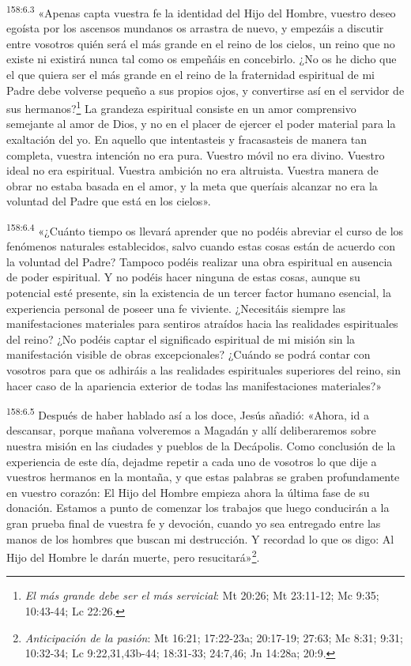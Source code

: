 \par
\textsuperscript{158:6.3} «Apenas capta vuestra fe la identidad del Hijo del Hombre, vuestro deseo egoísta por los ascensos mundanos os arrastra de nuevo, y empezáis a discutir entre vosotros quién será el más grande en el reino de los cielos, un reino que no existe ni existirá nunca tal como os empeñáis en concebirlo. ¿No os he dicho que el que quiera ser el más grande en el reino de la fraternidad espiritual de mi Padre debe volverse pequeño a sus propios ojos, y convertirse así en el servidor de sus hermanos?\footnote{\textit{El más grande debe ser el más servicial}: Mt 20:26; Mt 23:11-12; Mc 9:35; 10:43-44; Lc 22:26.} La grandeza espiritual consiste en un amor comprensivo semejante al amor de Dios, y no en el placer de ejercer el poder material para la exaltación del yo. En aquello que intentasteis y fracasasteis de manera tan completa, vuestra intención no era pura. Vuestro móvil no era divino. Vuestro ideal no era espiritual. Vuestra ambición no era altruista. Vuestra manera de obrar no estaba basada en el amor, y la meta que queríais alcanzar no era la voluntad del Padre que está en los cielos».

\par
\textsuperscript{158:6.4} «¿Cuánto tiempo os llevará aprender que no podéis abreviar el curso de los fenómenos naturales establecidos, salvo cuando estas cosas están de acuerdo con la voluntad del Padre? Tampoco podéis realizar una obra espiritual en ausencia de poder espiritual. Y no podéis hacer ninguna de estas cosas, aunque su potencial esté presente, sin la existencia de un tercer factor humano esencial, la experiencia personal de poseer una fe viviente. ¿Necesitáis siempre las manifestaciones materiales para sentiros atraídos hacia las realidades espirituales del reino? ¿No podéis captar el significado espiritual de mi misión sin la manifestación visible de obras excepcionales? ¿Cuándo se podrá contar con vosotros para que os adhiráis a las realidades espirituales superiores del reino, sin hacer caso de la apariencia exterior de todas las manifestaciones materiales?»

\par
\textsuperscript{158:6.5} Después de haber hablado así a los doce, Jesús añadió: «Ahora, id a descansar, porque mañana volveremos a Magadán y allí deliberaremos sobre nuestra misión en las ciudades y pueblos de la Decápolis. Como conclusión de la experiencia de este día, dejadme repetir a cada uno de vosotros lo que dije a vuestros hermanos en la montaña, y que estas palabras se graben profundamente en vuestro corazón: El Hijo del Hombre empieza ahora la última fase de su donación. Estamos a punto de comenzar los trabajos que luego conducirán a la gran prueba final de vuestra fe y devoción, cuando yo sea entregado entre las manos de los hombres que buscan mi destrucción. Y recordad lo que os digo: Al Hijo del Hombre le darán muerte, pero resucitará»\footnote{\textit{Anticipación de la pasión}: Mt 16:21; 17:22-23a; 20:17-19; 27:63; Mc 8:31; 9:31; 10:32-34; Lc 9:22,31,43b-44; 18:31-33; 24:7,46; Jn 14:28a; 20:9.}.

